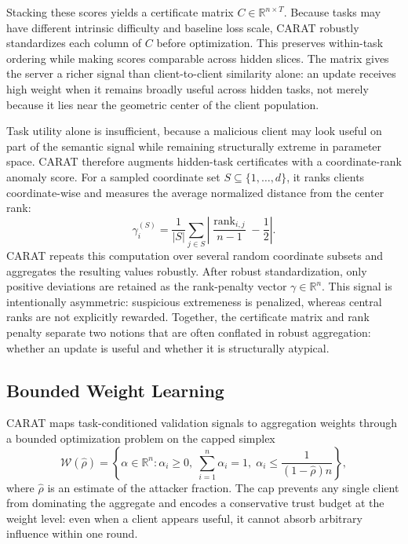 \documentclass{article}
\newcommand{\R}{\mathbb{R}}
\begin{document}
Stacking these scores yields a certificate matrix $C \in \R^{n \times T}$. Because tasks may have different intrinsic difficulty and baseline loss scale, CARAT robustly standardizes each column of $C$ before optimization. This preserves within-task ordering while making scores comparable across hidden slices. The matrix gives the server a richer signal than client-to-client similarity alone: an update receives high weight when it remains broadly useful across hidden tasks, not merely because it lies near the geometric center of the client population.

Task utility alone is insufficient, because a malicious client may look useful on part of the semantic signal while remaining structurally extreme in parameter space. CARAT therefore augments hidden-task certificates with a coordinate-rank anomaly score. For a sampled coordinate set $S \subseteq \{1,\dots,d\}$, it ranks clients coordinate-wise and measures the average normalized distance from the center rank:
\begin{equation}
\gamma_i^{(S)} = \frac{1}{|S|}\sum_{j \in S}
\left|
\frac{\operatorname{rank}_{i,j}}{n-1} - \frac{1}{2}
\right|.
\label{eq:rank}
\end{equation}
CARAT repeats this computation over several random coordinate subsets and aggregates the resulting values robustly. After robust standardization, only positive deviations are retained as the rank-penalty vector $\gamma\in\R^n$. This signal is intentionally asymmetric: suspicious extremeness is penalized, whereas central ranks are not explicitly rewarded. Together, the certificate matrix and rank penalty separate two notions that are often conflated in robust aggregation: whether an update is useful and whether it is structurally atypical.

\subsection{Bounded Weight Learning}

CARAT maps task-conditioned validation signals to aggregation weights through a bounded optimization problem on the capped simplex
\begin{equation}
\mathcal{W}(\hat{\rho}) =
\left\{
\alpha \in \R^n :
\alpha_i \ge 0,\;
\sum_{i=1}^n \alpha_i = 1,\;
\alpha_i \le \frac{1}{(1-\hat{\rho})n}
\right\},
\label{eq:capped-simplex}
\end{equation}
where $\hat{\rho}$ is an estimate of the attacker fraction. The cap prevents any single client from dominating the aggregate and encodes a conservative trust budget at the weight level: even when a client appears useful, it cannot absorb arbitrary influence within one round.
\end{document}
